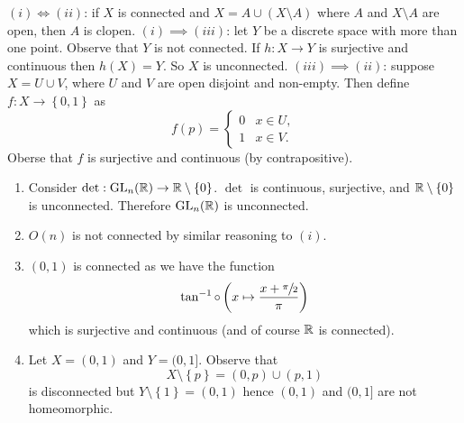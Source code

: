 \begin{solution}
	$(i) \iff (ii)$: if $X$ is connected and
	$X = A \cup ( X \setminus A)$ where $A$ and $X \setminus A$ are open, then
	$A$ is clopen.
	$(i) \implies (iii)$: let $Y$ be a discrete space with more than one point.
	Observe that $Y$ is not connected. 
	If $h: X \to Y$ is surjective and continuous then $h(X) = Y$.
	So $X$ is unconnected.
	$(iii) \implies (ii)$: suppose $X = U \cup V$, where $U$ and $V$ are open
	disjoint and non-empty.
	Then define $f: X \to \left\{
		0,1
	\right\}$
	as
	\[
		f(p) =
		\begin{cases}
			0 & x \in U, \\
			1 & x \in V.
		\end{cases}
	\]
	Oberse that $f$ is surjective and continuous (by contrapositive).
\end{solution}

\begin{examples}[]
	\begin{enumerate}
		\item Consider $\det: \operatorname{GL}_n(\mathbb{R}) \to \mathbb{R} \setminus \left\{
			0
		\right\}$.
		$\det$ is continuous, surjective, and $\mathbb{R} \setminus \left\{
			0
		\right\}$ is unconnected.
		Therefore $\operatorname{GL}_n(\mathbb{R})$ is unconnected.
		
		\item $O(n)$ is not connected by similar reasoning to $(i)$.

		\item $(0,1)$ is connected as we have the function
			\[
				\tan^{-1} \circ \left( 
					x \mapsto \frac{x + \sfrac{\pi}2}{\pi}  
				\right)
			\]
			which is surjective and continuous 
			(and of course $\mathbb{R}$ is connected).

		\item Let $X = (0,1)$ and $Y = (0,1]$.
			Observe that 
			\[
				X \setminus \left\{
					p
				\right\} =
				(0,p) \cup (p,1)
			\]
			is disconnected but $Y \setminus \left\{
				1
			\right\} = (0,1)$ hence $(0,1)$ and $(0,1]$
			are not homeomorphic.
	\end{enumerate}
\end{examples}
